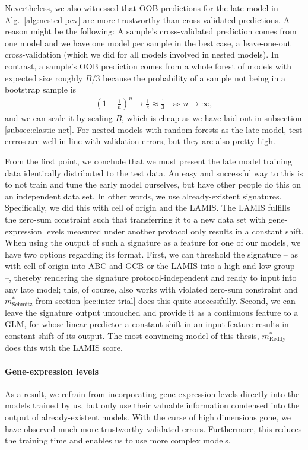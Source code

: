 Nevertheless, we also witnessed that OOB predictions for the late model in Alg.\ 
\ref{alg:nested-pcv} are more trustworthy than cross-validated predictions. A reason might be the 
following: A sample's cross-validated prediction comes 
from one model and we have one model per sample in the best case, a leave-one-out cross-validation 
(which we did for all models involved in nested models). In contrast, a sample's OOB prediction 
comes from a whole forest of models with expected size roughly $B/3$ because the probability of a 
sample not being in a bootstrap sample is
\begin{align}
    \left( 1 - \frac{1}{n} \right)^n \to \frac{1}{e} \approx \frac{1}{3} \quad \text{as } n \to 
    \infty,
\end{align}
and we can scale it by scaling $B$, which is cheap as we have laid out in subsection 
\ref{subsec:elastic-net}. For nested models with random forests as the late model, test errros 
are well in line with validation errors, but they are also pretty high.

From the first point, we conclude that we must present the late model training data identically distributed to the 
test data. An easy and successful way to this is to not train and tune the early model ourselves, 
but have other people do this on an independent data set. In other words, we use already-existent 
signatures. Specifically, we did this with cell of origin and the LAMIS. The LAMIS fulfills the 
zero-sum constraint such that transferring it to a new data set with gene-expression levels 
measured under another protocol only results in a constant shift. When using the output of such 
a signature as a feature for one of our models, we have two options regarding its format.
First, we can threshold the signature -- as with cell of origin into ABC and GCB or the LAMIS into 
a high and low group --, thereby rendering the signature protocol-independent and ready to input 
into any late model; this, of course, also works with violated zero-sum constraint and 
$m^*_\text{Schmitz}$ from section \ref{sec:inter-trial} 
does this quite successfully. Second, we can leave the signature output untouched and provide it as 
a continuous feature to a GLM, for whose linear predictor a constant shift in an input feature 
results in constant shift of its output. The most convincing model of this thesis, 
$m^*_\text{Reddy}$ does this with the LAMIS score.

\paragraph{Gene-expression levels}
As a result, we refrain from incorporating gene-expression levels directly into the models trained 
by us, but only use their valuable information condensed into the output of already-existent models. 
With the curse of high dimensions gone, we have observed much more trustworthy validated errors. 
Furthermore, this reduces the training time and enables us to use more complex models.

